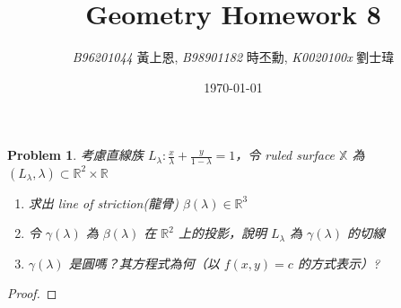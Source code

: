 \documentclass[10pt,a4paper]{article}
\newcommand{\LiHei}{\CJKfamily{lh}}
\newcounter{theProblemCounter}
\newtheorem{problem}[theProblemCounter]{Problem}
\begin{document}
\title{{Geometry Homework 8}}
\author{{\it{B96201044}} {\LiHei 黃上恩}, {\it{B98901182}} {\LiHei 時丕勳}, {\it{K0020100x}} {\LiHei 劉士瑋}}%
\date{\today}
\maketitle

\newcommand{\bx}{\mathbb{X}}
\newcommand{\bfx}{\mathbf{X}}
\newcommand{\sech}{\mbox{sech}}
\setcounter{theProblemCounter}{1}
\begin{problem}
考慮直線族 $L_\lambda: \frac{x}{\lambda} + \frac{y}{1-\lambda}=1$，令 ruled surface $\bx$ 為 $(L_\lambda, \lambda)\subset \mathbb{R}^2\times \mathbb{R}$
\begin{enumerate}
\item[(a)] 求出 line of striction(龍骨) $\beta(\lambda)\in\mathbb{R}^3$
\item[(b)] 令 $\gamma(\lambda)$ 為 $\beta(\lambda)$ 在 $\mathbb{R}^2$ 上的投影，說明 $L_\lambda$ 為 $\gamma(\lambda)$ 的切線
\item[(c)] $\gamma(\lambda)$ 是圓嗎？其方程式為何（以 $f(x,y)=c$ 的方式表示）?
\end{enumerate}
\end{problem}
\begin{proof}
\end{proof}
\end{document}
